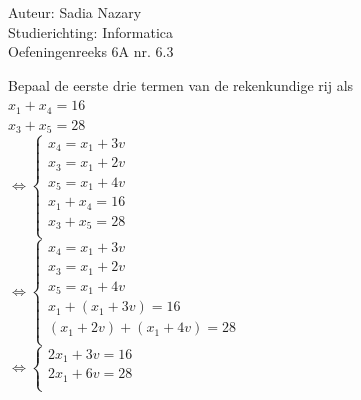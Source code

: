 \documentclass[a4paper]{article}
\begin{document}
\noindent \large Auteur: Sadia Nazary \\
\noindent \large Studierichting: Informatica\\
\noindent \large Oefeningenreeks 6A nr. 6.3\\

\medskip

\normalsize

Bepaal de eerste drie termen van de rekenkundige rij als \\

$ x_{1} + x_{4} = 16 $ \\

$ x_{3} + x_{5} = 28 $ \\

$\Leftrightarrow \left\{
\begin{array}{l}
    x_{4} = x_{1} + 3v \\
	
    x_{3} = x_{1} + 2v \\
	
	x_{5} = x_{1} + 4v \\
	
	x_{1} + x_{4} = 16 \\
	
	x_{3} + x_{5} = 28 \\
	
\end{array}
\right.$ \\

$\Leftrightarrow \left\{
\begin{array}{l}
    x_{4} = x_{1} + 3v \\
	
    x_{3} = x_{1} + 2v \\
	
	x_{5} = x_{1} + 4v \\
	
	x_{1} + \left( x_{1} + 3v \right) = 16 \\
	
	\left( x_{1} + 2v \right) + \left( x_{1} + 4v \right) = 28 \\
	
\end{array}
\right.$ \\

$\Leftrightarrow \left\{
\begin{array}{l}
    2x_{1} + 3v = 16 \\
	
	2x_{1} + 6v = 28 \\
	
\end{array}
\right.$ \\
\end{document}
